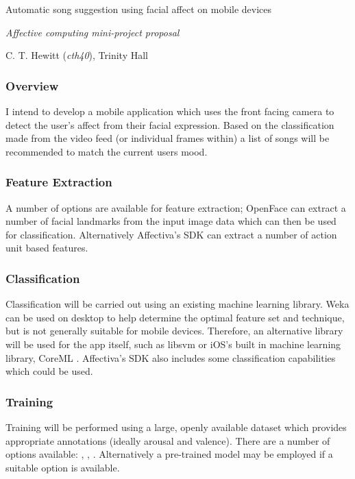 \documentclass[11pt]{article}
\begin{document}
\centerline{\Large Automatic song suggestion using facial affect on mobile devices}
\vspace{1em}
\centerline{\Large \emph{Affective computing mini-project proposal}}
\vspace{2em}
\centerline{\large C. T. Hewitt (\emph{cth40}), Trinity Hall}
\vspace{2em}

\begin{multicols}{2}
\small

\subsubsection*{Overview}
I intend to develop a mobile application which uses the front facing camera to detect the user's affect from their facial expression. Based on the classification made from the video feed (or individual frames within) a list of songs will be recommended to match the current users mood.

\subsubsection*{Feature Extraction}
A number of options are available for feature extraction; OpenFace \cite{openface} can extract a number of facial landmarks from the input image data which can then be used for classification. Alternatively Affectiva's SDK \cite{affectiva} can extract a number of action unit based features.

\subsubsection*{Classification}
Classification will be carried out using an existing machine learning library. Weka \cite{weka} can be used on desktop to help determine the optimal feature set and technique, but is not generally suitable for mobile devices. Therefore, an alternative library will be used for the app itself, such as libsvm \cite{libsvm} or iOS's built in machine learning library, CoreML \cite{coreml}. Affectiva's SDK also includes some classification capabilities which could be used.

\subsubsection*{Training}
Training will be performed using a large, openly available dataset which provides appropriate annotations (ideally arousal and valence). There are a number of options available: \cite{data1}, \cite{data2}, \cite{data3}. Alternatively a pre-trained model may be employed if a suitable option is available.


\end{multicols}
\end{document}
